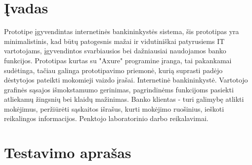 \documentclass[oneside]{VUMIFPSkursinis}
\begin{document}
\section{Įvadas}
Prototipe įgyvendintas internetinės bankininkystės sistema, šis prototipas yra minimalistinis, kad būtų patogesnis mažai ir vidutiniškai patyrusiems IT vartotojams, įgyvendintos svarbiausios bei dažniausiai naudojamos banko funkcijos.
Prototipas kurtas su "Axure" programine įranga, tai pakankamai sudėtinga, tačiau galinga prototipavimo priemonė, kurią suprasti padėjo dėstytojos pateikti mokomieji vaizdo įrašai.
Internetinė bankininkystė.
Vartotojo grafinės sąsajos išmokstamumo gerinimas, pagrindinėms funkcijoms pasiekti atliekamų žingsnių bei klaidų mažinimas.
Banko klientas - turi galimybę atlikti mokėjimus, peržiūrėti sąskaitos išrašus, kurti mokėjimo ruošinius, ieškoti reikalingos informacijos.
Penktojo laboratorinio darbo reikalavimai.
\section{Testavimo aprašas}
\end{document}
